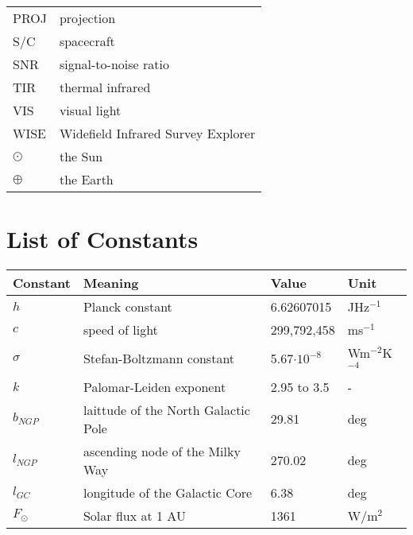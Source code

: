 \begin{table}[h!]
\begin{tabular}{l|l}
PROJ                  & projection                                                      \\
S/C                   & spacecraft                                                      \\
SNR                   & signal-to-noise ratio                                           \\
TIR                   & thermal infrared                                                \\
VIS                   & visual light                                                    \\
WISE                  & Widefield Infrared Survey Explorer                              \\
$\odot$                  & the Sun                                                         \\
$\oplus$                 & the Earth                                                      
\end{tabular}
\end{table}

\chapter*{List of Constants}

\begin{table}[h!]
\centering
\begin{tabular}{l|l|l|l}
\textbf{Constant} & \textbf{Meaning}                    & \textbf{Value} & \textbf{Unit} \\ \hline
$h$                 & Planck constant                     & 6.62607015     & JHz$^{-1}$         \\
$c$                 & speed of light                      & 299,792,458      & ms$^{-1}$           \\
$\sigma$             & Stefan-Boltzmann constant           & 5.67$\cdot 10^{-8}$       & Wm$^{-2}$K$^{-4}$       \\
$k$                 & Palomar-Leiden exponent             & 2.95 to 3.5    & -             \\
$b_{NGP}$              & laittude of the North Galactic Pole & 29.81          & deg           \\
$l_{NGP}$              & ascending node of the Milky Way     & 270.02         & deg           \\
$l_{GC}$               & longitude of the Galactic Core      & 6.38           & deg           \\
$F_{\odot}$            & Solar flux at 1 AU                  & 1361           & W/m$^2$         
\end{tabular}
\end{table}
